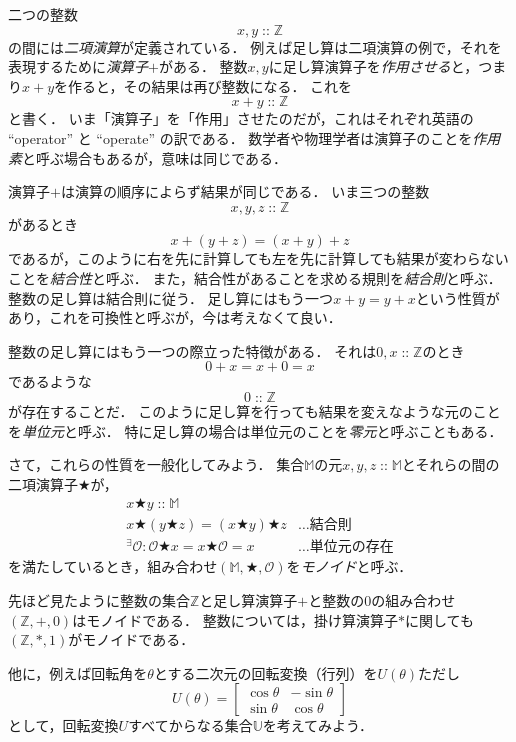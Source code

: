 \documentclass[twocolumn]{jsbook}
\newcommand{\keyword}[1]{\emph{#1}}
\newcommand{\binaryadd}{+}
\newcommand{\istypeof}{\mathop{::}}
\newcommand{\mathbinaryop}{\bigstar}
\newcommand{\mathidentity}{\mathcal{O}}
\newcommand{\mathsetname}[1]{\mathbb{#1}}
\newcommand{\mathtriple}[3]{(#1,#2,#3)}
\begin{document}
二つの整数$$x,y\istypeof\mathsetname{Z}$$の間には\keyword{二項演算}が定義されている．
例えば足し算は二項演算の例で，それを表現するために\keyword{演算子}$+$がある．
整数$x,y$に足し算演算子を\keyword{作用させる}と，つまり$x+y$を作ると，その結果は再び整数になる．
これを$$x+y\istypeof\mathsetname{Z}$$と書く．
いま「演算子」を「作用」させたのだが，これはそれぞれ英語の ``operator'' と ``operate'' の訳である．
数学者や物理学者は演算子のことを\keyword{作用素}と呼ぶ場合もあるが，意味は同じである．

演算子$\binaryadd$は演算の順序によらず結果が同じである．
いま三つの整数$$x,y,z\istypeof\mathsetname{Z}$$があるとき$$x+(y+z)=(x+y)+z$$であるが，このように右を先に計算しても左を先に計算しても結果が変わらないことを\keyword{結合性}と呼ぶ．
また，結合性があることを求める規則を\keyword{結合則}と呼ぶ．
整数の足し算は結合則に従う．
足し算にはもう一つ$x+y=y+x$という性質があり，これを可換性と呼ぶが，今は考えなくて良い．

整数の足し算にはもう一つの際立った特徴がある．
それは$0,x\istypeof\mathsetname{Z}$のとき$$0+x=x+0=x$$であるような$$0\istypeof\mathsetname{Z}$$が存在することだ．
このように足し算を行っても結果を変えなような元のことを\keyword{単位元}と呼ぶ．
特に足し算の場合は単位元のことを\keyword{零元}と呼ぶこともある．

さて，これらの性質を一般化してみよう．
集合$\mathsetname{M}$の元$x,y,z\istypeof\mathsetname{M}$とそれらの間の二項演算子$\mathbinaryop$が，
\begin{align}
x\mathbinaryop y\istypeof\mathsetname{M}\\
x\mathbinaryop(y\mathbinaryop z)=(x\mathbinaryop y)\mathbinaryop z&\dots\text{結合則}\\
{}^\exists\mathidentity:\mathidentity\mathbinaryop x=x\mathbinaryop\mathidentity=x&\dots\text{単位元の存在}
\end{align}
を満たしているとき，組み合わせ$\mathtriple{\mathsetname{M}}{\mathbinaryop}{\mathidentity}$を\keyword{モノイド}と呼ぶ．

先ほど見たように整数の集合$\mathsetname{Z}$と足し算演算子$+$と整数の$0$の組み合わせ$\mathtriple{\mathsetname{Z}}{+}{0}$はモノイドである．
整数については，掛け算演算子$*$に関しても$\mathtriple{\mathsetname{Z}}{*}{1}$がモノイドである．

他に，例えば回転角を$\theta$とする二次元の回転変換（行列）を$U(\theta)$ただし$$U(\theta)=\begin{bmatrix}\cos\theta&-\sin\theta\\\sin\theta&\cos\theta\end{bmatrix}$$として，回転変換$U$すべてからなる集合$\mathsetname{U}$を考えてみよう．
\end{document}
